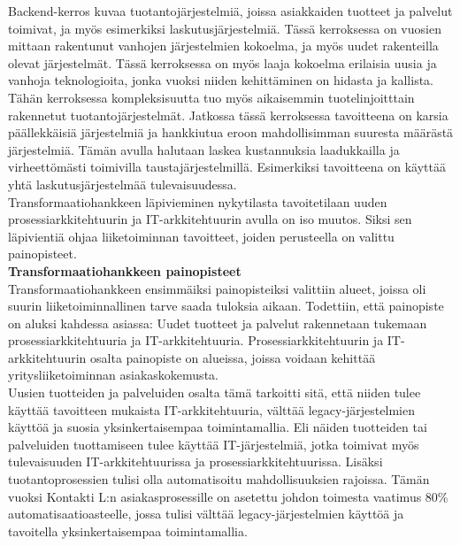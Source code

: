 \documentclass[finnish,12pt,a4paper,pdftex]{article}
\begin{document}
Backend-kerros kuvaa tuotantojärjestelmiä, joissa asiakkaiden tuotteet ja palvelut toimivat, ja myös esimerkiksi laskutusjärjestelmiä. Tässä kerroksessa on vuosien mittaan rakentunut vanhojen järjestelmien kokoelma, ja myös uudet rakenteilla olevat järjestelmät. Tässä kerroksessa on myös laaja kokoelma erilaisia uusia ja vanhoja teknologioita, jonka vuoksi niiden kehittäminen on hidasta ja kallista. Tähän kerroksessa kompleksisuutta tuo myös aikaisemmin tuotelinjoitttain rakennetut tuotantojärjestelmät. Jatkossa tässä kerroksessa tavoitteena on karsia päällekkäisiä järjestelmiä ja hankkiutua eroon mahdollisimman suuresta määrästä järjestelmiä. Tämän avulla halutaan laskea kustannuksia laadukkailla ja virheettömästi toimivilla taustajärjestelmillä. Esimerkiksi tavoitteena on käyttää yhtä laskutusjärjestelmää tulevaisuudessa.\\

Transformaatiohankkeen läpivieminen nykytilasta tavoitetilaan uuden prosessiarkkitehtuurin ja IT-arkkitehtuurin avulla on iso muutos. Siksi sen läpivientiä ohjaa liiketoiminnan tavoitteet, joiden perusteella on valittu painopisteet.\\

\textbf{Transformaatiohankkeen painopisteet}\\

Transformaatiohankkeen ensimmäiksi painopisteiksi valittiin alueet, joissa oli suurin liiketoiminnallinen tarve saada tuloksia aikaan. Todettiin, että painopiste on aluksi kahdessa asiassa: Uudet tuotteet ja palvelut rakennetaan tukemaan prosessiarkkitehtuuria ja IT-arkkitehtuuria. Prosessiarkkitehtuurin ja IT-arkkitehtuurin osalta painopiste on alueissa, joissa voidaan kehittää yritysliiketoiminnan asiakaskokemusta.\\

Uusien tuotteiden ja palveluiden osalta tämä tarkoitti sitä, että niiden tulee käyttää tavoitteen mukaista IT-arkkitehtuuria, välttää legacy-järjestelmien käyttöä ja suosia yksinkertaisempaa toimintamallia. Eli näiden tuotteiden tai palveluiden tuottamiseen tulee käyttää IT-järjestelmiä, jotka toimivat myös tulevaisuuden IT-arkkitehtuurissa ja prosessiarkkitehtuurissa. Lisäksi tuotantoprosessien tulisi olla automatisoitu mahdollisuuksien rajoissa. Tämän vuoksi Kontakti L:n asiakasprosessille on asetettu johdon toimesta vaatimus 80\% automatisaatioasteelle, jossa tulisi välttää legacy-järjestelmien käyttöä ja tavoitella yksinkertaisempaa toimintamallia. \\
\end{document}
